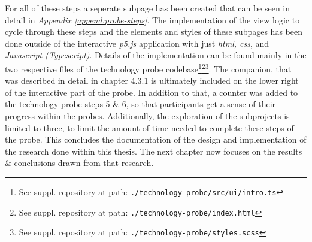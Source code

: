 For all of these steps a seperate subpage has been created that can be seen in detail in \textit{Appendix \ref{append:probe-steps}}. The implementation of the view logic to cycle through these steps and the elements and styles of these subpages has been done outside of the interactive \textit{p5.js} application with just \textit{\gls{html}, \gls{css}}, and \textit{Javascript (Typescript)}. Details of the implementation can be found mainly in the two respective files of the technology probe codebase\footnote{See suppl. repository at path: \texttt{./technology-probe/src/ui/intro.ts}}\footnote{See suppl. repository at path: \texttt{./technology-probe/index.html}}\footnote{See suppl. repository at path: \texttt{./technology-probe/styles.scss}}. The companion, that was described in detail in chapter 4.3.1 is ultimately included on the lower right of the interactive part of the probe. In addition to that, a counter was added to the technology probe steps 5 \& 6, so that participants get a sense of their progress within the probes. Additionally, the exploration of the subprojects is limited to three, to limit the amount of time needed to complete these steps of the probe. This concludes the documentation of the design and implementation of the research done within this thesis. The next chapter now focuses on the results \& conclusions drawn from that research.
